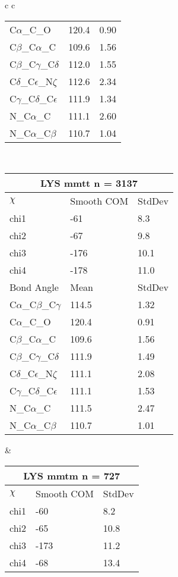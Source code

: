 \begin{longtable}{ c c }
\begin{tabular}{ l l l }
  C$\alpha$\_C\_O & 120.4 & 0.90\\
  C$\beta$\_C$\alpha$\_C & 109.6 & 1.56\\
  C$\beta$\_C$\gamma$\_C$\delta$ & 112.0 & 1.55\\
  C$\delta$\_C$\epsilon$\_N$\zeta$ & 112.6 & 2.34\\
  C$\gamma$\_C$\delta$\_C$\epsilon$ & 111.9 & 1.34\\
  N\_C$\alpha$\_C & 111.1 & 2.60\\
  N\_C$\alpha$\_C$\beta$ & 110.7 & 1.04\\
  \bottomrule
  \end{tabular}
  \\
  \begin{tabular}{ l l l }
  \toprule
  \multicolumn{3}{c}{LYS \textbf{mmtt} n = 3137} \\ \toprule
  $\chi$       & Smooth COM & StdDev \\ \midrule
  chi1 & -61 & 8.3 \\ 
  chi2 & -67 & 9.8 \\ 
  chi3 & -176 & 10.1 \\ 
  chi4 & -178 & 11.0 \\ \midrule
  Bond Angle   & Mean     & StdDev \\ \midrule
  C$\alpha$\_C$\beta$\_C$\gamma$ & 114.5 & 1.32\\
  C$\alpha$\_C\_O & 120.4 & 0.91\\
  C$\beta$\_C$\alpha$\_C & 109.6 & 1.56\\
  C$\beta$\_C$\gamma$\_C$\delta$ & 111.9 & 1.49\\
  C$\delta$\_C$\epsilon$\_N$\zeta$ & 111.1 & 2.08\\
  C$\gamma$\_C$\delta$\_C$\epsilon$ & 111.1 & 1.53\\
  N\_C$\alpha$\_C & 111.5 & 2.47\\
  N\_C$\alpha$\_C$\beta$ & 110.7 & 1.01\\
  \bottomrule
  \end{tabular}
  &
  \begin{tabular}{ l l l }
  \toprule
  \multicolumn{3}{c}{LYS \textbf{mmtm} n = 727} \\ \toprule
  $\chi$       & Smooth COM & StdDev \\ \midrule
  chi1 & -60 & 8.2 \\ 
  chi2 & -65 & 10.8 \\ 
  chi3 & -173 & 11.2 \\ 
  chi4 & -68 & 13.4 \\ \midrule

\end{tabular}
\end{longtable}

